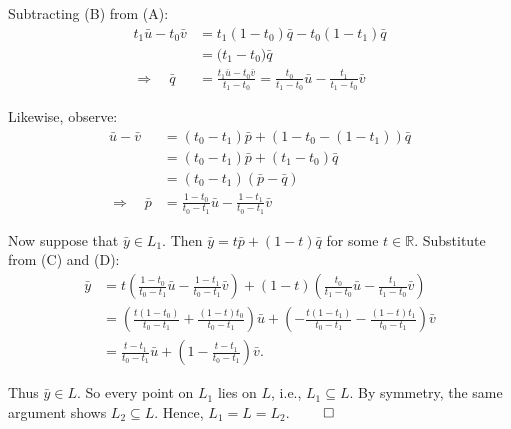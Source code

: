 \begin{proofbox}
Subtracting (B) from (A):
\begin{align*}
t_1\bar{u} - t_0\bar{v}
&= t_1(1 - t_0)\bar{q} - t_0(1 - t_1)\bar{q} \\
&= \big( t_1 - t_0 \big)\bar{q} \\
\Rightarrow \quad \bar{q} &= \frac{t_1\bar{u} - t_0\bar{v}}{t_1 - t_0}
= \frac{t_0}{t_1 - t_0} \bar{u} - \frac{t_1}{t_1 - t_0} \bar{v} \tag{C}
\end{align*}

\vspace{1em}


Likewise, observe:
\begin{align*}
\bar{u} - \bar{v}
&= (t_0 - t_1)\bar{p} + (1 - t_0 - (1 - t_1))\bar{q} \\
&= (t_0 - t_1)\bar{p} + (t_1 - t_0)\bar{q} \\
&= (t_0 - t_1)(\bar{p} - \bar{q}) \\
\Rightarrow \quad \bar{p}
&= \frac{1 - t_0}{t_0 - t_1} \bar{u} - \frac{1 - t_1}{t_0 - t_1} \bar{v} \tag{D}
\end{align*}
    
Now suppose that \( \bar{y} \in L_1 \). Then \( \bar{y} = t\bar{p} + (1 - t)\bar{q} \) for some \( t \in \mathbb{R} \).  
Substitute from (C) and (D):
\begin{align*}
\bar{y}
&= t\left( \frac{1 - t_0}{t_0 - t_1} \bar{u} - \frac{1 - t_1}{t_0 - t_1} \bar{v} \right)
+ (1 - t) \left( \frac{t_0}{t_1 - t_0} \bar{u} - \frac{t_1}{t_1 - t_0} \bar{v} \right) \\
&= \left( \frac{t(1 - t_0)}{t_0 - t_1} + \frac{(1 - t)t_0}{t_0 - t_1} \right) \bar{u}
+ \left( -\frac{t(1 - t_1)}{t_0 - t_1} - \frac{(1 - t)t_1}{t_0 - t_1} \right) \bar{v} \\
&= \frac{t - t_1}{t_0 - t_1} \bar{u}
+ \left( 1 - \frac{t - t_1}{t_0 - t_1} \right) \bar{v}.
\end{align*}

Thus \( \bar{y} \in L \). So every point on \( L_1 \) lies on \( L \), i.e., \( L_1 \subseteq L \).  
By symmetry, the same argument shows \( L_2 \subseteq L \).  
Hence, \( L_1 = L = L_2 \).  
\hfill \( \qed \)
\end{proofbox}
